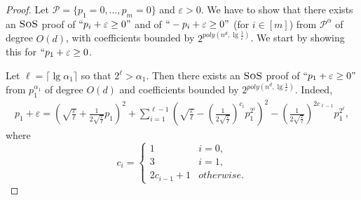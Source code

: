 \documentclass[11pt]{article}
\newcommand{\sos}{\text{\sc{SoS}}}
\newcommand{\1}{\textbf{1}}
\newtheorem{proposition}[theorem]{Proposition}
\begin{document}
\begin{proof}
    Let $\mathcal{P} = \{p_1 = 0, \dots, p_m=0\}$ and $\varepsilon > 0$. We have to show that there exists an $\sos$ proof of $``p_i + \varepsilon \geq 0"$ and of $``-p_i + \varepsilon \geq 0"$ (for $i \in [m]$) from $\mathcal{P}^{\alpha}$ of degree $O(d)$, with coefficients bounded by $2^{poly(n^d, \lg \frac{1}{\varepsilon})}$. We start by showing this for $``p_1 + \varepsilon \geq 0$.

    Let $\ell = \lceil \lg \alpha_1 \rceil$ so that $2^{\ell} > \alpha_1$. Then there exists an $\sos$ proof of $``p_1 + \varepsilon \geq 0"$ from $p_1^{\alpha_1}$ of degree $O(d)$ and coefficients bounded by $2^{poly(n^d, \lg \frac{1}{\varepsilon})}$. Indeed,
    \begin{align*}
        p_1 + \varepsilon = \left(\sqrt{\frac{\varepsilon}{\ell}} + \frac{1}{2\sqrt{\frac{\varepsilon}{\ell}}} p_1 \right)^2 + \sum_{i=1}^{\ell-1} \left( \sqrt{\frac{\varepsilon}{\ell}} - \left( \frac{1}{2 \sqrt{\frac{\varepsilon}{\ell}}} \right)^{c_i} p_1^{2^i} \right)^2 - \left( \frac{1}{2 \sqrt{\frac{\varepsilon}{\ell}}} \right)^{2c_{\ell-1}} p_1^{2^\ell},
    \end{align*}
    where
    \begin{equation*}
        c_i = 
        \begin{cases}
            1 & i = 0, \\
            3 & i = 1, \\
            2c_{i-1} + 1 & otherwise.
        \end{cases}
    \end{equation*}
\end{proof}

\end{document}
